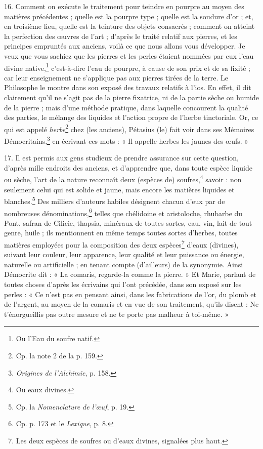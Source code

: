 \documentclass[a4paper, 11pt, oneside, polutonikogreek, french]{article}
\begin{document}
16. Comment on exécute le traitement pour teindre en pourpre au moyen des matières précédentes ; quelle est la pourpre type ; quelle est la soudure d'or ; et, en troisième lieu, quelle est la teinture des objets consacrés ; comment on atteint la perfection des œuvres de l'art ; d'après le traité relatif aux pierres, et les principes empruntés aux anciens, voilà ce que nous allons vous développer. Je veux que vous sachiez que les pierres et les perles étaient nommées par eux l'eau divine native,\footnote{Ou l'Eau du soufre natif.} c'est-à-dire l'eau de pourpre, à cause de son prix et de sa fixité ; car leur enseignement ne s'applique pas aux pierres tirées de la terre. Le Philosophe le montre dans son exposé des travaux relatifs à l'ios. En effet, il dit clairement qu'il ne s'agit pas de la pierre fixatrice, ni de la partie sèche ou humide de la pierre ; mais d'une méthode pratique, dans laquelle concourent la qualité des parties, le mélange des liquides et l'action propre de l'herbe tinctoriale. Or, ce qui est appelé \emph{herbe}\footnote{Cp. la note 2 de la p. 159.} chez (les anciens), Pétasius (le) fait voir dans ses Mémoires Démocritains,\footnote{\emph{Origines de l'Alchimie}, p. 158.} en écrivant ces mots : « Il appelle herbes les jaunes des œufs. »

17. Il est permis aux gens studieux de prendre assurance sur cette question, d'après mille endroits des anciens, et d'apprendre que, dans toute espèce liquide ou sèche, l'art de la nature reconnaît deux (espèces de) soufres,\footnote{Ou eaux divines.} savoir : non seulement celui qui est solide et jaune, mais encore les matières liquides et blanches.\footnote{Cp. la \emph{Nomenclature de l'œuf}, p. 19.} Des milliers d'auteurs habiles désignent chacun d'eux par de nombreuses dénominations,\footnote{Cp. p. 173 et le \emph{Lexique}, p. 8.} telles que chélidoine et aristoloche, rhubarbe du Pont, safran de Cilicie, thapsia, minéraux de toutes sortes, eau, vin, lait de tout genre, huile ; ils mentionnent en même temps toutes sortes d'herbes, toutes matières employées pour la composition des deux espèces\footnote{Les deux espèces de soufres ou d'eaux divines, signalées plus haut.} d'eaux (divines), suivant leur couleur, leur apparence, leur qualité et leur puissance ou énergie, naturelle ou artificielle ; en tenant compte (d'ailleurs) de la synonymie. Ainsi Démocrite dit : « La comaris, regarde-la comme la pierre. » Et Marie, parlant de toutes choses d'après les écrivains qui l'ont précédée, dans son exposé sur les perles : « Ce n'est pas en pensant ainsi, dans les fabrications de l'or, du plomb et de l'argent, au moyen de la comaris et en vue de son traitement, qu'ils disent : Ne t'énorgueillis pas outre mesure et ne te porte pas malheur à toi-même. »
\end{document}
